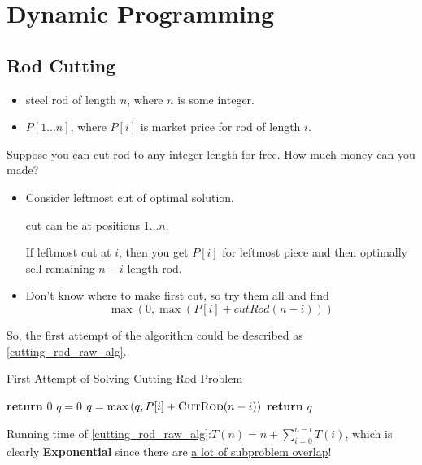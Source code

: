 \section{Dynamic Programming}

\subsection{Rod Cutting}

\begin{itemize}
\item steel rod of length $n$, where $n$ is some integer.
\item $P[1...n]$, where $P[i]$ is market price for rod of length $i$.
\end{itemize}

\question

Suppose you can cut rod to any integer length for free.
How much money can you made?

\analysis
\begin{itemize}
\item Consider leftmost cut of optimal solution.

cut can be at positions $1...n$.

If leftmost cut at $i$, then you get $P[i]$ for leftmost piece and then optimally sell remaining $n-i$ length rod.

\item Don't know where to make first cut, so try them all and find
\[\max\left(0, \max(P[i] + cutRod(n-i))\right)\]
\end{itemize}

So, the first attempt of the algorithm could be described as \cref{cutting_rod_raw_alg}.

\begin{algorithm}[H]
\caption{First Attempt of Solving Cutting Rod Problem}\label{cutting_rod_raw_alg}
\begin{algorithmic}[1]
 
    \State \textbf{return} {$0$}
\EndIf
\State $q=0$
    \State $q = \max\left(q, P[i]+\textsc{CutRod}(n-i)\right)$
\EndFor
\State \textbf{return} {$q$}
\EndProcedure
\end{algorithmic}
\end{algorithm}

Running time of \cref{cutting_rod_raw_alg}:$T(n) = n + \sum_{i=0}^{n-i}T(i)$, which is clearly \textbf{Exponential} since there are \underline{a lot of subproblem overlap}!

